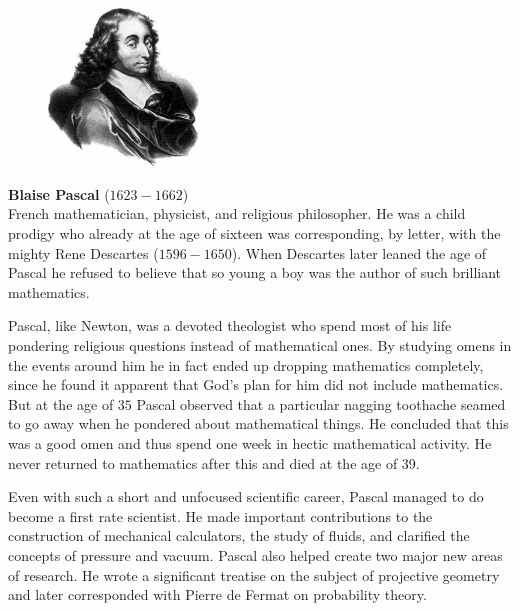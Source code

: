 \begin{framed}
\begin{figure}
\includegraphics[width=4cm]{images/blaise_pascal.jpg}
\end{figure} 
\textbf{Blaise Pascal} ($1623-1662$)\\ French mathematician, physicist, and religious philosopher. He
was a child prodigy who already at the age of sixteen was corresponding, by letter, with the mighty Rene Descartes
($1596-1650$). When Descartes later leaned the age of Pascal he refused to believe that so young a boy was the author of
such brilliant mathematics. 

\myindent Pascal, like Newton, was a devoted theologist who spend most of his life pondering religious questions instead
of mathematical ones. By studying omens in the events around him he in fact ended up dropping mathematics completely,
since he found it apparent that God's plan for him did not include mathematics. But at the age of $35$ Pascal observed
that a particular nagging toothache seamed to go away when he pondered about mathematical things.  He concluded that
this was a good omen and thus spend one week in hectic mathematical activity. He never returned to mathematics after
this and died at the age of 39. 

\myindent Even with such a short and unfocused scientific career, Pascal managed to do become a first rate scientist. He
made important contributions to the construction of mechanical calculators, the study of fluids, and clarified the
concepts of pressure and vacuum. Pascal also helped create two major new areas of research. He wrote a significant
treatise on the subject of projective geometry and later corresponded with Pierre de Fermat on probability theory.
\end{framed}
